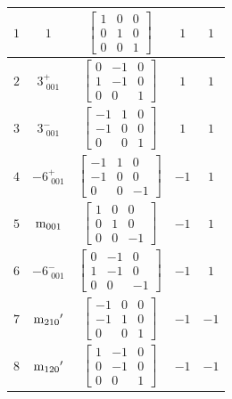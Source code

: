 \documentclass[fleqn,8pt]{jsarticle}
\begin{document}
\begin{longtable}{ccccc}
$ 1 $ & $ 1 $ & $ \begin{bmatrix} 1 & 0 & 0 \\ 0 & 1 & 0 \\ 0 & 0 & 1 \end{bmatrix} $ & $ 1 $ & $ 1 $ \\ \hline
$ 2 $ & $ 3^{+}_{\,\,001} $ & $ \begin{bmatrix} 0 & -1 & 0 \\ 1 & -1 & 0 \\ 0 & 0 & 1 \end{bmatrix} $ & $ 1 $ & $ 1 $ \\ \hline
$ 3 $ & $ 3^{-}_{\,\,001} $ & $ \begin{bmatrix} -1 & 1 & 0 \\ -1 & 0 & 0 \\ 0 & 0 & 1 \end{bmatrix} $ & $ 1 $ & $ 1 $ \\ \hline
$ 4 $ & $ -6^{+}_{\,\,001} $ & $ \begin{bmatrix} -1 & 1 & 0 \\ -1 & 0 & 0 \\ 0 & 0 & -1 \end{bmatrix} $ & $ -1 $ & $ 1 $ \\ \hline
$ 5 $ & $ {\rm m}_{001} $ & $ \begin{bmatrix} 1 & 0 & 0 \\ 0 & 1 & 0 \\ 0 & 0 & -1 \end{bmatrix} $ & $ -1 $ & $ 1 $ \\ \hline
$ 6 $ & $ -6^{-}_{\,\,001} $ & $ \begin{bmatrix} 0 & -1 & 0 \\ 1 & -1 & 0 \\ 0 & 0 & -1 \end{bmatrix} $ & $ -1 $ & $ 1 $ \\ \hline
$ 7 $ & $ {\rm m}_{210}{}' $ & $ \begin{bmatrix} -1 & 0 & 0 \\ -1 & 1 & 0 \\ 0 & 0 & 1 \end{bmatrix} $ & $ -1 $ & $ -1 $ \\ \hline
$ 8 $ & $ {\rm m}_{120}{}' $ & $ \begin{bmatrix} 1 & -1 & 0 \\ 0 & -1 & 0 \\ 0 & 0 & 1 \end{bmatrix} $ & $ -1 $ & $ -1 $ \\ \hline

\end{longtable}
\end{document}

